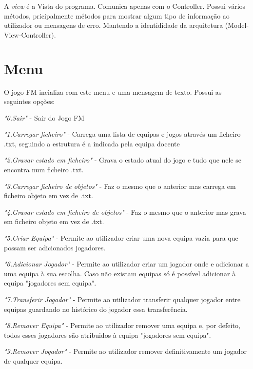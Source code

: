 \documentclass[a4paper]{report}
\begin{document}
	A \emph{view} é a Vista do programa. Comunica apenas com o Controller. Possui vários métodos, pricipalmente métodos para mostrar algum tipo de informação ao utilizador ou mensagens de erro. Mantendo a identididade da arquitetura (Model-View-Controller).
    
    \section{{\large Menu}}
    O jogo FM incializa com este menu e uma mensagem de texto. Possui as seguintes opções:
	
                    \textit{"0.Sair"} - Sair do Jogo FM
                    
                    \textit{"1.Carregar ficheiro"} - Carrega uma lista de equipas e jogos através um ficheiro .txt, seguindo a estrutura é a indicada pela equipa docente
                    
                    \textit{"2.Gravar estado em ficheiro"} - Grava o estado atual do jogo e tudo que nele se encontra num ficheiro .txt.
                    
                    \textit{"3.Carregar ficheiro de objetos"} - Faz o mesmo que o anterior mas carrega em ficheiro objeto em vez de .txt.
                    
                    \textit{"4.Gravar estado em ficheiro de objetos"} - Faz o mesmo que o anterior mas grava em ficheiro objeto em vez de .txt.
                    
                    \textit{"5.Criar Equipa" } - Permite ao utilizador criar uma nova equipa vazia para que possam ser adicionados jogadores.
                    
                    \textit{"6.Adicionar Jogador" } - Permite ao utilizador criar um jogador onde e adicionar a uma equipa à sua escolha. Caso não existam equipas só é possível adicionar à equipa "jogadores sem equipa".
                    
                    \textit{"7.Transferir Jogador"} - Permite ao utilizador transferir qualquer jogador entre equipas guardando no histórico do jogador essa transferência.
                    
                    \textit{"8.Remover Equipa"} - Permite ao utilizador remover uma equipa e, por defeito, todos esses jogadores são atribuidos à equipa "jogadores sem equipa".
                    
                    \textit{"9.Remover Jogador"} - Permite ao utilizador remover definitivamente um jogador de qualquer equipa.
                    
\end{document}
